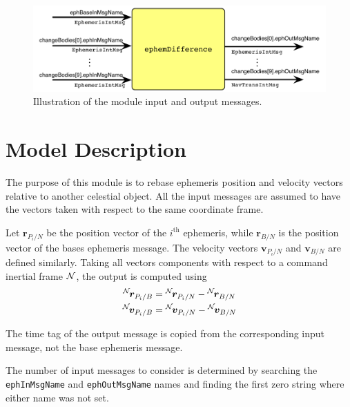

\begin{figure}[h]
	\centerline{
		\includegraphics{Figures/moduleImg}
	}
	\caption{Illustration of the module input and output messages.}
	\label{fig:moduleImg}
\end{figure}


\section{Model Description}
The purpose of this module is to rebase ephemeris position and velocity vectors relative to another celestial object.  All the input messages are assumed to have the vectors taken with respect to the same coordinate frame.

Let $\bm r_{P_{i}/N}$ be the position vector of the $i^{\text{th}}$ ephemeris, while $\bm r_{B/N}$ is the position vector of the bases ephemeris message.  The velocity vectors $\bm v_{P_{i}/N}$ and $\bm v_{B/N}$ are defined similarly.  Taking all vectors components with respect to a command inertial frame $\cal N$, the output is computed using
\begin{align}
	\leftexp{N}{\bm r}_{P_{i}/B} &= \leftexp{N}{\bm r}_{P_{i}/N} - \leftexp{N}{\bm r}_{B/N}
	\\
	\leftexp{N}{\bm v}_{P_{i}/B} &= \leftexp{N}{\bm v}_{P_{i}/N} - \leftexp{N}{\bm v}_{B/N}
\end{align}

The time tag of the output message is copied from the corresponding input message, not the base ephemeris message.

The number of input messages to consider is determined by searching the {\tt ephInMsgName} and {\tt ephOutMsgName} names and finding the first zero string where either name was not set.  

